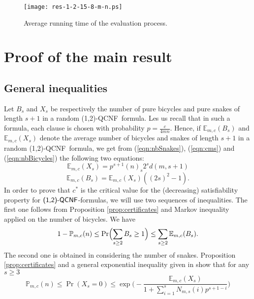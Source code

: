 \documentclass[aop,noinfoline]{imsart}
\newcommand{\onetwo}{(1,2)}
\newcommand{\onetwoqcnf}{\mbox{\sf \onetwo-QCNF}}
\newcommand{\EE}{\mathbb{E}}
\newcommand{\pmc}{\mathbb{P}_{m,c}}
\begin{document}
\begin{figure}[th]
  \centering
 \texttt{[image: res-1-2-15-8-m-n.ps]}
  \caption{Average running time of the evaluation process.}
  \label{fig:running-time}
\end{figure}
\medskip

\fi


\section{Proof of the main result} \label{sec:main}

\subsection{General inequalities}
Let $B_s$ and $X_s$ be respectively the
number of pure bicycles and pure snakes of length $s+1$   in a random
\onetwoqcnf  \ formula.     Les us recall that in such a formula, each
clause is chosen with probability $\displaystyle
p=\frac{c}{4mn}$. Hence, if  $\EE_{m,c}(B_s)$ and $\EE_{m,c}(X_s)$
denote   the average number of  bicycles and snakes of length $s+1$ in
a random \onetwoqcnf  \ formula,    we get from (\ref{eqn:nbSnakes}),
(\ref{eqn:cms}) and (\ref{eqn:nbBicycles}) the following two equations:
    \begin{equation} \label{MeanSnakes}
    \EE_{m,c}(X_s) =  p^{s+1}(n)_s2^sd(m,s+1) 
    \end{equation}
    \begin{equation}\label{Meanbicycles}
      \EE_{m,c}(B_s)= \EE_{m,c}(X_s) ((2s)^2 -1). 
      \end{equation}
    In order to prove that $c^{*}$ is the critical value for the (decreasing) satisfiability  property for  $\onetwoqcnf$-formulas, we will use  two  sequences of inequalities. The first one follows from    Proposition \ref{prop:certificates} and Markov
inequality applied on the number of bicycles. We have 
\begin{equation}\label{eqn:first_moment}
  1-\pmc(n)\le \Pr \Bigl (\sum_{s\geq 2} B_s \geq 1\Bigr )\le \sum_{s\geq 2} \EE_{m,c}(B_s).
\end{equation}
The second one is obtained in   considering  the number of snakes. Proposition
\ref{prop:certificates} and  a general exponential inequality given in
\cite[Theorem 2.18  ii)]{JansonLR-00} show that   for any $s\geq 3$ 
\begin{equation}
\label{eqn:Janson}
  \pmc(n)\le \Pr(X_s=0)\le \exp \Biggl  ( - \frac{\EE_{m,c}(X_s)}{1+ \sum_{i=1}^{s} N_{m,s}(i) p^{s+1-i}} \Biggr )
\end{equation}
\end{document}
